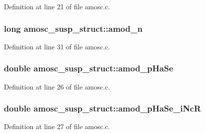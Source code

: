 Definition at line 21 of file amosc.\+c.

\subsubsection[{\texorpdfstring{amod\+\_\+n}{amod_n}}]{\setlength{\rightskip}{0pt plus 5cm}long amosc\+\_\+susp\+\_\+struct\+::amod\+\_\+n}\hypertarget{structamosc__susp__struct_ae360e13798869a359e9d567d5eda4c62}{}\label{structamosc__susp__struct_ae360e13798869a359e9d567d5eda4c62}


Definition at line 31 of file amosc.\+c.

\subsubsection[{\texorpdfstring{amod\+\_\+p\+Ha\+Se}{amod_pHaSe}}]{\setlength{\rightskip}{0pt plus 5cm}double amosc\+\_\+susp\+\_\+struct\+::amod\+\_\+p\+Ha\+Se}\hypertarget{structamosc__susp__struct_a0143b71974c5e0a062821d04bc9677bd}{}\label{structamosc__susp__struct_a0143b71974c5e0a062821d04bc9677bd}


Definition at line 26 of file amosc.\+c.

\subsubsection[{\texorpdfstring{amod\+\_\+p\+Ha\+Se\+\_\+i\+NcR}{amod_pHaSe_iNcR}}]{\setlength{\rightskip}{0pt plus 5cm}double amosc\+\_\+susp\+\_\+struct\+::amod\+\_\+p\+Ha\+Se\+\_\+i\+NcR}\hypertarget{structamosc__susp__struct_a244e4c8a4c0612250e8f3f1cafb8e053}{}\label{structamosc__susp__struct_a244e4c8a4c0612250e8f3f1cafb8e053}


Definition at line 27 of file amosc.\+c.

